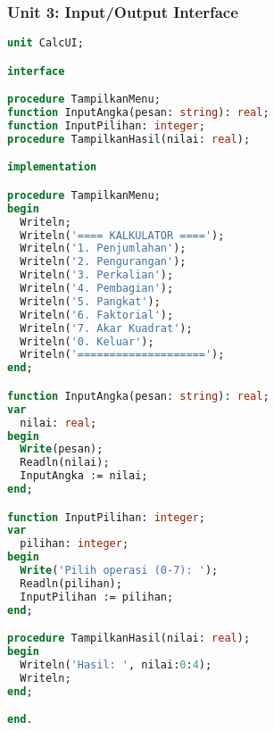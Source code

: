 \documentclass[../main.tex]{subfiles}
\begin{document}
\subsubsection{Unit 3: Input/Output Interface}
\begin{lstlisting}[language=Pascal, caption={calcui.pas - antarmuka pengguna}]
unit CalcUI;

interface

procedure TampilkanMenu;
function InputAngka(pesan: string): real;
function InputPilihan: integer;
procedure TampilkanHasil(nilai: real);

implementation

procedure TampilkanMenu;
begin
  Writeln;
  Writeln('==== KALKULATOR ====');
  Writeln('1. Penjumlahan');
  Writeln('2. Pengurangan');
  Writeln('3. Perkalian');
  Writeln('4. Pembagian');
  Writeln('5. Pangkat');
  Writeln('6. Faktorial');
  Writeln('7. Akar Kuadrat');
  Writeln('0. Keluar');
  Writeln('====================');
end;

function InputAngka(pesan: string): real;
var
  nilai: real;
begin
  Write(pesan);
  Readln(nilai);
  InputAngka := nilai;
end;

function InputPilihan: integer;
var
  pilihan: integer;
begin
  Write('Pilih operasi (0-7): ');
  Readln(pilihan);
  InputPilihan := pilihan;
end;

procedure TampilkanHasil(nilai: real);
begin
  Writeln('Hasil: ', nilai:0:4);
  Writeln;
end;

end.
\end{lstlisting}
\end{document}
